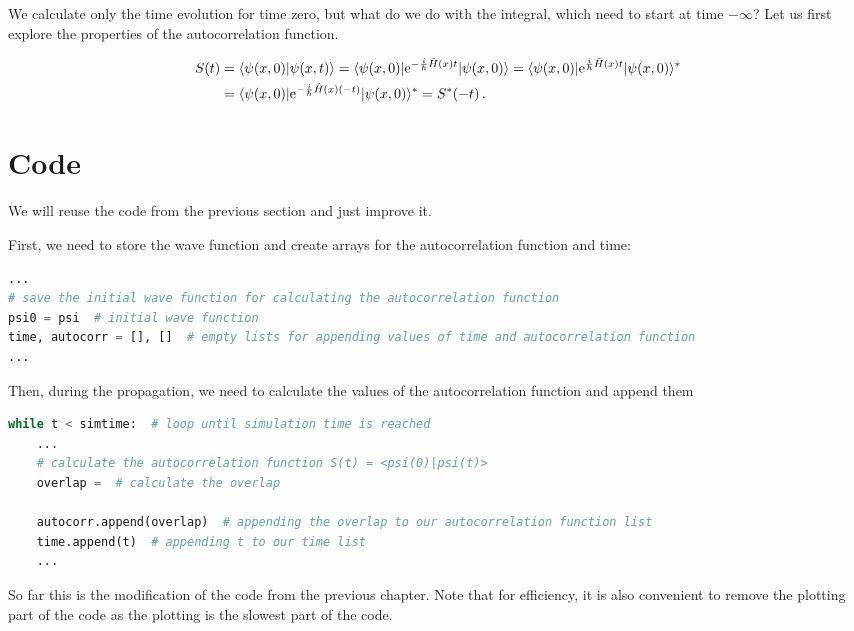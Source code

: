 We calculate only the time evolution for time zero, but what do we do with the integral, which need to start at time $-\infty$? Let us first explore the properties of the autocorrelation function.

\begin{align}
    S(t) &= \langle \psi(x,0) | \psi(x,t) \rangle = \langle \psi(x,0) | \mathrm{e}^{-\frac{i}{\hbar}\hat{H}(x)t} |\psi(x,0) \rangle = \langle \psi(x,0) | \mathrm{e}^{\frac{i}{\hbar}\hat{H}(x)t} |\psi(x,0) \rangle^* \notag \\
    &= \langle \psi(x,0) | \mathrm{e}^{-\frac{i}{\hbar}\hat{H}(x)(-t)} |\psi(x,0) \rangle^* = S^*(-t) \, .
\end{align}


\section{Code}

We will reuse the code from the previous section and just improve it.

First, we need to store the wave function and create arrays for the autocorrelation function and time:
\begin{lstlisting}[language=Python, style=mystyle2]
...
# save the initial wave function for calculating the autocorrelation function
psi0 = psi  # initial wave function
time, autocorr = [], []  # empty lists for appending values of time and autocorrelation function
...
\end{lstlisting}

Then, during the propagation, we need to calculate the values of the autocorrelation function and append them
\begin{lstlisting}[language=Python, style=mystyle2]
while t < simtime:  # loop until simulation time is reached
    ... 
    # calculate the autocorrelation function S(t) = <psi(0)|psi(t)>
    overlap =  # calculate the overlap

    autocorr.append(overlap)  # appending the overlap to our autocorrelation function list
    time.append(t)  # appending t to our time list
    ...
\end{lstlisting}

So far this is the modification of the code from the previous chapter. Note that for efficiency, it is also convenient to remove the plotting part of the code as the plotting is the slowest part of the code.

